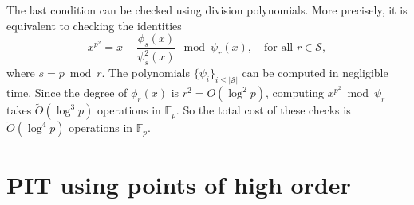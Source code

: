 \documentclass[12pt]{article}
\theoremstyle{plain}
\theoremstyle{definition}
\newcommand{\abs}[1]{\left\vert#1\right\vert}
\newcommand{\tildO}{\tilde{O}}
\def\F{\ensuremath{\mathbb{F}}}
\begin{document}
The last condition can be checked using division polynomials. More precisely, it is equivalent to 
checking the identities
\begin{equation}
\label{equ:schoof}
	x^{p^2} = x - \frac{\phi_s(x)}{\psi_s^2(x)} ~ \bmod \psi_r(x), \quad \text{for all } r \in 
	\mathcal{S},
\end{equation}
where $s = p \bmod r$. The polynomials $\{ \psi_i \}_{i \le \abs{\mathcal{S}}}$ can be computed in 
negligible time. Since the degree of $\phi_r(x)$ is $r^2 = O(\log^2 p)$, computing $x^{p^2} \bmod 
\psi_r$ takes $\tildO(\log^3 p)$ operations in $\F_p$. So the total cost of these checks is 
$\tildO(\log^4 p)$ operations in $\F_p$.




\section{PIT using points of high order}
\label{sec:pit-h-order}
\end{document}
